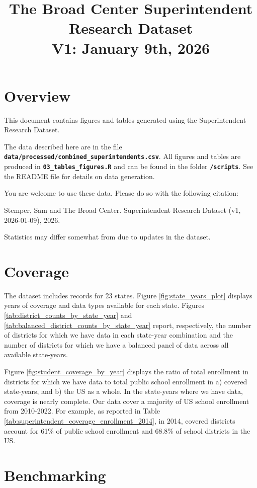\documentclass[12pt]{article}
\title{The Broad Center Superintendent Research Dataset \\  V1: January 9th, 2026}
\date{}
\begin{document}
\maketitle
\section{Overview}
This document contains figures and tables generated using the Superintendent Research Dataset. 

The data described here are in the file \textbf{\texttt{data/processed/combined\_superintendents.csv}}. All figures and tables are produced in \textbf{\texttt{03\_tables\_figures.R}} and can be found in the folder \textbf{\texttt{/scripts}}. See the README file for details on data generation. 

You are welcome to use these data. Please do so with the following citation: 

\noindent Stemper, Sam and The Broad Center. Superintendent Research Dataset (v1, 2026-01-09), 2026. 

Statistics may differ somewhat from \citet{stemper} due to updates in the dataset. 

\section{Coverage}
The dataset includes records for 23 states. Figure \ref{fig:state_years_plot} displays years of coverage and data types available for each state. Figures \ref{tab:district_counts_by_state_year} and \ref{tab:balanced_district_counts_by_state_year} report, respectively, the number of districts for which we have data in each state-year combination and the number of districts for which we have a balanced panel of data across all available state-years. 

Figure \ref{fig:student_coverage_by_year} displays the ratio of total enrollment in districts for which we have data to total public school enrollment in a) covered state-years, and b) the US as a whole. In the state-years where we have data, coverage is nearly complete. Our data cover a majority of US school enrollment from 2010-2022. For example, as reported in Table \ref{tab:superintendent_coverage_enrollment_2014}, in 2014, covered districts account for 61\% of public school enrollment and 68.8\% of school districts in the US. 

\section{Benchmarking}
\end{document}
